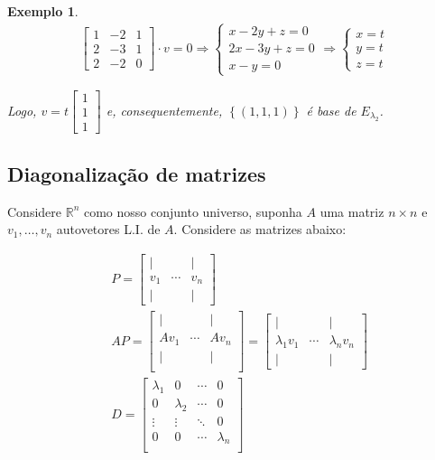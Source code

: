 \documentclass{article}
\newtheorem*{example}{Exemplo}
\begin{document}
\begin{example}
	\begin{align*}
	\begin{bmatrix}
	1 & -2 & 1 \\
	2 & -3 & 1 \\
	2 & -2 & 0
	\end{bmatrix}\cdot v = 0 \Rightarrow \begin{cases}
	x - 2y + z = 0 \\
	2x - 3y + z = 0 \\
	x - y = 0
	\end{cases} \Rightarrow \begin{cases}
	x = t\\
	y = t\\
	z = t
	\end{cases}
	\end{align*}
	
	\par\vspace{0.3cm} Logo, $v = t \begin{bmatrix}
	1\\
	1\\
	1
	\end{bmatrix}$ e, consequentemente, $ \left\{ (1,1,1)  \right\} $ é base de $E_{\lambda_2}$.	
\end{example}


\subsection{Diagonalização de matrizes}
\hspace{12pt} Considere $\mathbb{R}^n$ como nosso conjunto universo, suponha $A$ uma matriz $n\times n$ e $v_1, \dots, v_n$ autovetores L.I. de $A$. Considere as matrizes abaixo:

\begin{align*}
&P = \begin{bmatrix}
\vert &  & \vert\\
v_1 & \cdots & v_n \\
\vert & & \vert 
\end{bmatrix} \\
&AP = \begin{bmatrix}
\vert &  & \vert \\
Av_1 & \cdots & Av_n \\
\vert &  & \vert \\
\end{bmatrix} = \begin{bmatrix}
\vert &  & \vert \\
\lambda_1 v_1 & \cdots & \lambda_n v_n \\
\vert &  & \vert 
\end{bmatrix}\\
&D = \begin{bmatrix}
\lambda_1 & 0 & \cdots & 0 \\
0 & \lambda_2 & \cdots & 0 \\
\vdots & \vdots & \ddots & 0 \\
0 & 0 & \cdots & \lambda_n \\
\end{bmatrix}
\end{align*}
\end{document}
